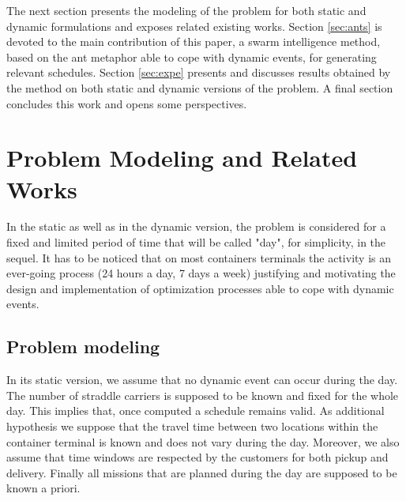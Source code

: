 \documentclass[review]{elsarticle}
\begin{document}
The next section presents the modeling of the problem for both static and dynamic formulations and exposes related existing works. Section \ref{sec:ants} is devoted to the main contribution of this paper, a swarm intelligence method, based on the ant metaphor able to cope with dynamic events, for generating relevant schedules. Section \ref{sec:expe} presents and discusses results obtained by the method on both static and dynamic versions of the problem. A final section concludes this work and opens some perspectives.


\section{Problem Modeling and Related Works}


In the static as well as in the dynamic version, the problem is considered for a fixed and limited period of time that will be called "day", for simplicity, in the sequel. It has to be noticed that on most containers terminals the activity is an ever-going process (24 hours a day, 7 days a week) justifying and motivating the design and implementation of optimization processes able to cope with dynamic events. 

\subsection{Problem modeling}

In its static version, we assume that no dynamic event can occur during the day. The number of straddle carriers is supposed to be known and fixed for the whole day. This implies that, once computed a schedule remains valid. As additional hypothesis we suppose that the travel time between two locations within the container terminal is known and does not vary during the day. Moreover, we also assume that time windows are respected by the customers for both pickup and delivery. Finally all missions that are planned during the day are supposed to be known a priori. \\
\end{document}
